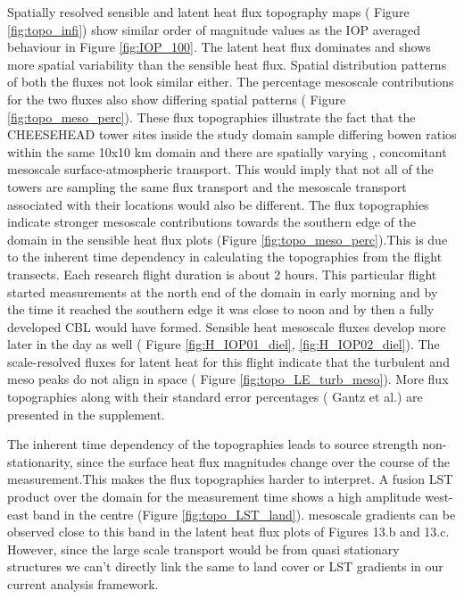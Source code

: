 \documentclass[draft]{agujournal2019}
\begin{document}
Spatially resolved sensible and latent heat flux topography maps ( Figure \ref{fig:topo_infi}) show similar order of magnitude values as  the IOP averaged behaviour in Figure \ref{fig:IOP_100}. The latent heat flux dominates and shows more spatial variability than the sensible heat flux. Spatial distribution patterns of both the fluxes not look similar either. The percentage mesoscale contributions for the two fluxes also show differing spatial patterns ( Figure \ref{fig:topo_meso_perc}). These flux topographies illustrate the fact that the CHEESEHEAD tower sites inside the study domain sample differing bowen ratios within the same 10x10 km domain and there are spatially varying , concomitant  mesoscale surface-atmospheric transport. This would imply that not all of the towers are sampling the same flux transport and the mesoscale transport associated with their locations would also be different. The flux topographies indicate stronger mesoscale contributions towards the southern edge of the domain in the sensible heat flux plots (Figure \ref{fig:topo_meso_perc}).This is due to the inherent time dependency in calculating the topographies from the flight transects. Each research flight duration is about 2 hours. This particular flight started measurements at the north end of the domain in early morning and by the time it reached the southern edge it was close to noon and by then a fully developed CBL would have formed. Sensible heat mesoscale fluxes develop more later in the day as well ( Figure \ref{fig:H_IOP01_diel}, \ref{fig:H_IOP02_diel}). The scale-resolved fluxes for latent heat for this flight indicate that the turbulent and meso peaks do not align in space ( Figure \ref{fig:topo_LE_turb_meso}). More flux topographies along with their standard error percentages ( Gantz et al.) are presented in the supplement. 

The inherent time dependency of the topographies leads to source strength non-stationarity, since the surface heat flux magnitudes change over the course of the measurement.This makes the flux topographies harder to interpret. A fusion LST product over the domain \cite{desai_multisensor_2021} for the measurement time shows a high amplitude west-east band in the centre (Figure \ref{fig:topo_LST_land}). mesoscale gradients can be observed close to this band in the latent heat flux plots of Figures 13.b and 13.c. However, since the large scale transport would be from quasi stationary structures we can't directly link the same to land cover or LST gradients in our current analysis framework. 
\end{document}
